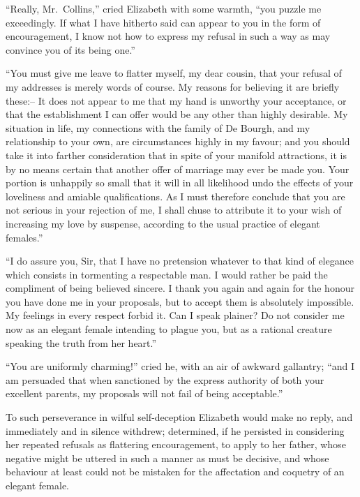 “Really, Mr.\ Collins,” cried Elizabeth with some
warmth, “you puzzle me exceedingly. If what I have
hitherto said can appear to you in the form of encouragement,
I know not how to express my refusal in such a way
as may convince you of its being one.”

“You must give me leave to flatter myself, my dear
cousin, that your refusal of my addresses is merely
words of course. My reasons for believing it are briefly
these:-- It does not appear to me that my hand is unworthy
your acceptance, or that the establishment I can
offer would be any other than highly desirable. My
situation in life, my connections with the family of
De Bourgh, and my relationship to your own, are circumstances
highly in my favour; and you should take
it into farther consideration that in spite of your manifold
attractions, it is by no means certain that another offer
of marriage may ever be made you. Your portion is
unhappily so small that it will in all likelihood undo the
effects of your loveliness and amiable qualifications. As
I must therefore conclude that you are not serious in your
rejection of me, I shall chuse to attribute it to your wish
of increasing my love by suspense, according to the usual
practice of elegant females.”

“I do assure you, Sir, that I have no pretension
whatever to that kind of elegance which consists in
tormenting a respectable man. I would rather be paid
the compliment of being believed sincere. I thank you
again and again for the honour you have done me in
your proposals, but to accept them is absolutely impossible.
My feelings in every respect forbid it. Can
I speak plainer? Do not consider me now as an elegant
female intending to plague you, but as a rational creature
speaking the truth from her heart.”

“You are uniformly charming!” cried he, with an air
of awkward gallantry; “and I am persuaded that when
sanctioned by the express authority of both your excellent
parents, my proposals will not fail of being acceptable.”

To such perseverance in wilful self-deception Elizabeth
would make no reply, and immediately and in silence
withdrew; determined, if he persisted in considering her
repeated refusals as flattering encouragement, to apply
to her father, whose negative might be uttered in such
a manner as must be decisive, and whose behaviour
at least could not be mistaken for the affectation and
coquetry of an elegant female.



